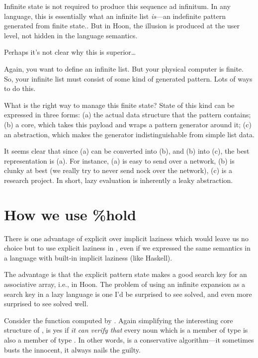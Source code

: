 Infinite state is not required to produce this sequence ad
infinitum.  In any language, this is essentially what an infinite
list \emph{is}---an indefinite pattern generated from finite state..
But in Hoon, the illusion is produced at the user level, not
hidden in the language semantics.

Perhaps it's not clear why this is superior\ldots{}

Again, you want to define an infinite list.   But your physical
computer is finite.  So, your infinite list must consist of some
kind of generated pattern.  Lots of ways to do this.

What is the right way to manage this finite state?  State of this
kind can be expressed in three forms: (a) the actual data
structure that the pattern contains; (b) a core, which takes this
payload and wraps a pattern generator around it; (c) an
abstraction, which makes the generator indistinguishable from
simple list data.

It seems clear that since (a) can be converted into (b), and (b)
into (c), the best representation is (a).  For instance, (a) is
easy to send over a network, (b) is clunky at best (we really try
to never send nock over the network), (c) is a research project.
In short, lazy evaluation is inherently a leaky abstraction.

\section{How we use \%hold}

There is one advantage of explicit over implicit laziness which
would leave us no choice but to use explicit laziness in , 
even if we expressed the same semantics in a language with
built-in implicit laziness (like Haskell).

The advantage is that the explicit pattern state makes a good
search key for an associative array, i.e.,  in Hoon.  The
problem of using an infinite expansion as a search key in a lazy
language is one I'd be surprised to see solved, and even more
surprised to see solved well. 

Consider the function computed by .  Again simplifying
the interesting core structure of ,  is yes
if \emph{it can verify that} every noun which is a member of type
 is also a member of type .  In other words, 
is a conservative algorithm---it sometimes busts the innocent,
it always nails the guilty.

